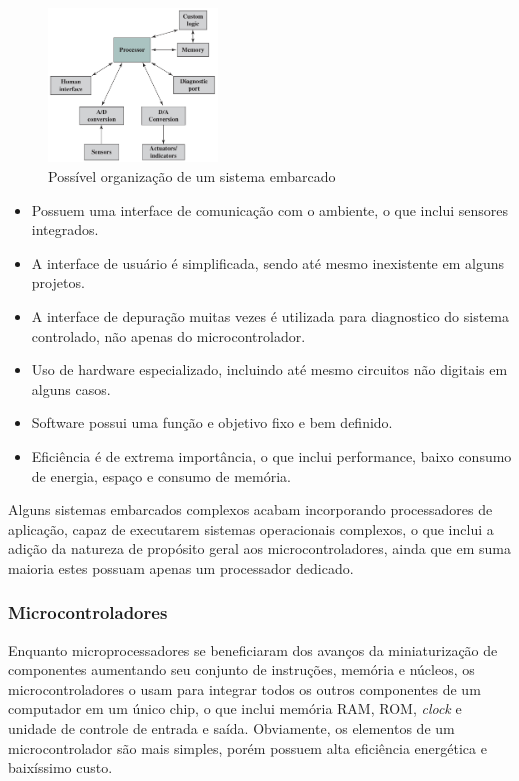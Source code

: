 \documentclass{article}
\begin{document}
\begin{figure}[h]
    \centering
    \includegraphics[width=0.4\textwidth]{embarcado.png}
    \caption{Possível organização de um sistema embarcado}
\end{figure}

\begin{itemize}
    \item Possuem uma interface de comunicação com o ambiente,
        o que inclui sensores integrados.

    \item A interface de usuário é simplificada, sendo até mesmo
        inexistente em alguns projetos.

    \item A interface de depuração muitas vezes é utilizada para
        diagnostico do sistema controlado, não apenas do microcontrolador.

    \item Uso de hardware especializado, incluindo até mesmo circuitos
        não digitais em alguns casos.

    \item Software possui uma função e objetivo fixo e bem definido.

    \item Eficiência é de extrema importância, o que inclui performance,
        baixo consumo de energia, espaço e consumo de memória.
\end{itemize}

Alguns sistemas embarcados complexos acabam incorporando processadores de
aplicação, capaz de executarem sistemas operacionais complexos, o que inclui a
adição da natureza de propósito geral aos microcontroladores, ainda que em suma
maioria estes possuam apenas um processador dedicado.

\subsubsection{Microcontroladores}
Enquanto microprocessadores se beneficiaram dos avanços da miniaturização de
componentes aumentando seu conjunto de instruções, memória e núcleos, os
microcontroladores o usam para integrar todos os outros componentes de um
computador em um único chip, o que inclui memória RAM, ROM, \textit{clock} e
unidade de controle de entrada e saída. Obviamente, os elementos de um
microcontrolador são mais simples, porém possuem alta eficiência energética e
baixíssimo custo.
\end{document}
